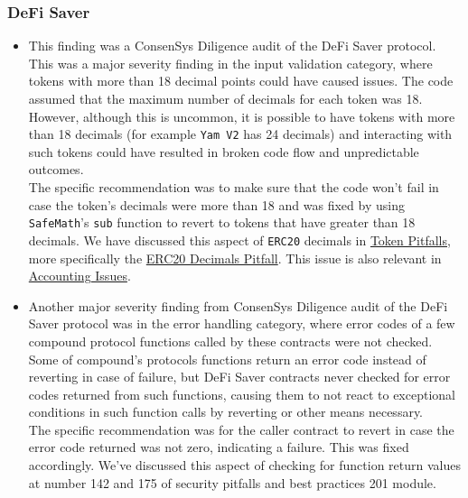\subsubsection{DeFi Saver}\label{defi-saver}

\begin{itemize}
\item
  This finding was a ConsenSys Diligence audit of the DeFi Saver
  protocol. This was a major severity finding in the input validation
  category, where tokens with more than 18 decimal points could have
  caused issues. The code assumed that the maximum number of decimals
  for each token was 18. However, although this is uncommon, it is
  possible to have tokens with more than 18 decimals (for example
  \texttt{Yam\ V2} has 24 decimals) and interacting with such tokens
  could have resulted in broken code flow and unpredictable outcomes.\\

  The specific recommendation was to make sure that the code won't fail
  in case the token's decimals were more than 18 and was fixed by using
  \texttt{SafeMath}'s \texttt{sub} function to revert to tokens that
  have greater than 18 decimals. We have discussed this aspect of
  \texttt{ERC20} decimals in
  \href{../3.Security_Pitfalls_and_Best_Practices/3.36_Token_Pitfalls.md}{Token
  Pitfalls}, more specifically the
  \href{../3.Security_Pitfalls_and_Best_Practices/3.36_Token_Pitfalls.md\#erc20-decimals}{ERC20
  Decimals Pitfall}. This issue is also relevant in
  \href{../3.Security_Pitfalls_and_Best_Practices/3.43_Application_Logic_Pitfalls.md\#accounting-issues}{Accounting
  Issues}.
\item
  Another major severity finding from ConsenSys Diligence audit of the
  DeFi Saver protocol was in the error handling category, where error
  codes of a few compound protocol functions called by these contracts
  were not checked. Some of compound's protocols functions return an
  error code instead of reverting in case of failure, but DeFi Saver
  contracts never checked for error codes returned from such functions,
  causing them to not react to exceptional conditions in such function
  calls by reverting or other means necessary.\\

  The specific recommendation was for the caller contract to revert in
  case the error code returned was not zero, indicating a failure. This
  was fixed accordingly. We've discussed this aspect of checking for
  function return values at number 142 and 175 of security pitfalls and
  best practices 201 module.
\end{itemize}

